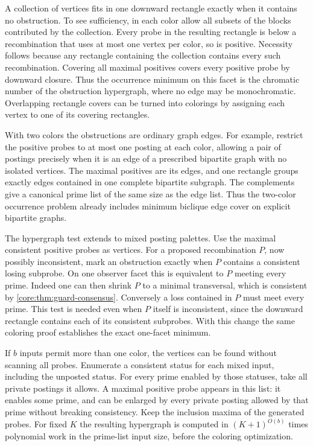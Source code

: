 A collection of vertices fits in one downward rectangle
exactly when it contains no obstruction. To see sufficiency,
in each color allow all subsets of the blocks contributed by
the collection. Every probe in the resulting rectangle is
below a recombination that uses at most one vertex per color,
so is positive. Necessity follows because any rectangle
containing the collection contains every such recombination.
Covering all maximal positives covers every positive probe by
downward closure. Thus the occurrence minimum on this facet
is the chromatic number of the obstruction hypergraph, where
no edge may be monochromatic. Overlapping rectangle covers
can be turned into colorings by assigning each vertex to one
of its covering rectangles.

With two colors the obstructions are ordinary graph edges.
For example, restrict the positive probes to at most one
posting at each color, allowing a pair of postings precisely
when it is an edge of a prescribed bipartite graph with no
isolated vertices. The maximal positives are its edges, and
one rectangle groups exactly edges contained in one complete
bipartite subgraph. The complements give a canonical prime
list of the same size as the edge list. Thus the two-color
occurrence problem already includes minimum biclique edge
cover on explicit bipartite graphs.

The hypergraph test extends to mixed posting palettes. Use the
maximal consistent positive probes as vertices. For a proposed
recombination $P$, now possibly inconsistent, mark an obstruction
exactly when $P$ contains a consistent losing subprobe. On one
observer facet this is equivalent to $P$ meeting every prime.
Indeed one can then shrink $P$ to a minimal transversal, which
is consistent by \cref{core:thm:guard-consensus}. Conversely a
loss contained in $P$ must meet every prime. This test is needed
even when $P$ itself is inconsistent, since the downward rectangle
contains each of its consistent subprobes. With this change the
same coloring proof establishes the exact one-facet minimum.

If $b$ inputs permit more than one color, the vertices can be
found without scanning all probes. Enumerate a consistent status
for each mixed input, including the unposted status. For every
prime enabled by those statuses, take all private postings it
allows. A maximal positive probe appears in this list: it enables
some prime, and can be enlarged by every private posting allowed
by that prime without breaking consistency. Keep the inclusion
maxima of the generated probes. For fixed $K$ the resulting
hypergraph is computed in $(K+1)^{O(b)}$ times polynomial work in
the prime-list input size, before the coloring optimization.

